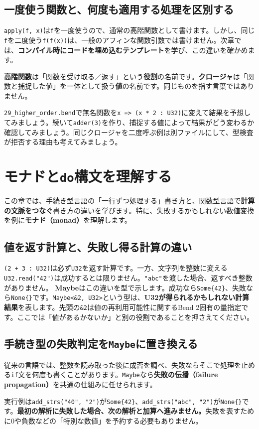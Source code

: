 \documentclass[11pt,a4paper,openany]{book}
\newcommand{\code}[1]{\texttt{#1}}
\newcommand{\term}[1]{\textbf{#1}}
\newcommand{\readcode}[2]{}
\newcommand{\exercise}[1]{\begin{exercisebox}#1\end{exercisebox}}
\begin{document}
\section{一度使う関数と、何度も適用する処理を区別する}
\code{apply(f, x)}は\code{f}を一度使うので、通常の高階関数として書けます。しかし、同じ\code{f}を二度使う\code{f(f(x))}は、一般のアフィンな関数引数では書けません。次章では、\textbf{コンパイル時にコードを埋め込むテンプレート}を学び、この違いを確かめます。
\begin{pointbox}
\term{高階関数}は「関数を受け取る／返す」という\textbf{役割}の名前です。\term{クロージャ}は「関数と捕捉した値」を一体として扱う\textbf{値}の名前です。同じものを指す言葉ではありません。
\end{pointbox}
\exercise{\code{29\_higher\_order.bend}で無名関数を\code{x => (x * 2 : U32)}に変えて結果を予想してみましょう。続いて\code{adder(3)}を作り、捕捉する値によって結果がどう変わるか確認してみましょう。同じクロージャを二度呼ぶ例は別ファイルにして、型検査が拒否する理由も考えてみましょう。}

\chapter{モナドと\code{do}構文を理解する}
\begin{tcolorbox}[colback=blue!3,colframe=blue!16,boxrule=.35pt,arc=1mm,left=3mm,right=3mm,top=2mm,bottom=2mm]
\small この章では、手続き型言語の「一行ずつ処理する」書き方と、関数型言語で\textbf{計算の文脈をつなぐ}書き方の違いを学びます。特に、失敗するかもしれない数値変換を例に\term{モナド（monad）}を理解します。
\end{tcolorbox}

\section{値を返す計算と、失敗し得る計算の違い}
\code{(2 + 3 : U32)}は必ず\code{U32}を返す計算です。一方、文字列を整数に変える\code{U32.read("42")}は成功するとは限りません。\code{"abc"}を渡した場合、返すべき整数がありません。
\term{Maybe}はこの違いを型で示します。成功なら\code{Some\{42\}}、失敗なら\code{None\{\}}です。\code{Maybe<\&2, U32>}という型は、\textbf{U32が得られるかもしれない計算結果}を表します。先頭の\code{\&2}は値の再利用可能性に関するBend 2固有の量指定です。ここでは「値があるかないか」と別の役割であることを押さえてください。

\section{手続き型の失敗判定を\code{Maybe}に置き換える}
従来の言語では、整数を読み取った後に成否を調べ、失敗ならそこで処理を止める\code{if}文を何度も書くことがあります。\code{Maybe}なら\term{失敗の伝播（failure propagation）}を共通の仕組みに任せられます。
\readcode{21_monadic_maybe.bend}{二つの文字列を安全に加算する（21\_monadic\_maybe.bend）}
実行例は\code{add\_strs("40", "2")}が\code{Some\{42\}}、\code{add\_strs("abc", "2")}が\code{None\{\}}です。\textbf{最初の解析に失敗した場合、次の解析と加算へ進みません。}失敗を表すために0や負数などの「特別な数値」を予約する必要もありません。
\end{document}
